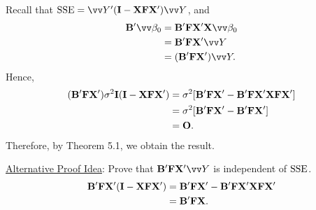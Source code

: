 \begin{Theorem}{}{}
\begin{enumerate}[(1)]
              Recall that $ \SSE=\Vector{Y}'(\Matrix{I}-\Matrix{X}\Matrix{F}\Matrix{X}')\Vector{Y} $,
              and
              \begin{align*}
                  \Matrix{B}'\Vector{\beta}_0
                   & =\Matrix{B}'\Matrix{F}\Matrix{X}'\Matrix{X}\Vector{\beta}_0 \\
                   & =\Matrix{B}'\Matrix{F}\Matrix{X}'\Vector{Y}                 \\
                   & =(\Matrix{B}'\Matrix{F}\Matrix{X}')\Vector{Y}.
              \end{align*}
              Hence,
              \begin{align*}
                  (\mathbf{B}'\mathbf{F}\mathbf{X}')\sigma^2 \mathbf{I}(\mathbf{I}-\mathbf{X}\mathbf{F}\mathbf{X}')
                   & =\sigma^2[\mathbf{B}'\mathbf{F}\mathbf{X}'-\mathbf{B}'\mathbf{F}\mathbf{X}'\mathbf{X}\mathbf{F}\mathbf{X}'] \\
                   & =\sigma^2[\mathbf{B}'\mathbf{F}\mathbf{X}'-\mathbf{B}'\mathbf{F}\mathbf{X}']                                \\
                   & =\mathbf{O}.
              \end{align*}
              Therefore, by Theorem 5.1, we obtain the result.

              \underline{Alternative Proof Idea}: Prove that $ \Matrix{B}'\Matrix{F}\Matrix{X}'\Vector{Y} $ is independent of $ \text{SSE} $.
              \begin{align*}
                  \mathbf{B}'\mathbf{F}\mathbf{X}'(\mathbf{I}-\mathbf{X}\mathbf{F}\mathbf{X}')
                   & =\mathbf{B}'\mathbf{F}\mathbf{X}'-\mathbf{B}'\mathbf{F}\mathbf{X}'\mathbf{X}\mathbf{F}\mathbf{X}' \\
                   & =\mathbf{B}'\mathbf{F}\mathbf{X}.
              \end{align*}
    \end{enumerate}
\end{Theorem}
